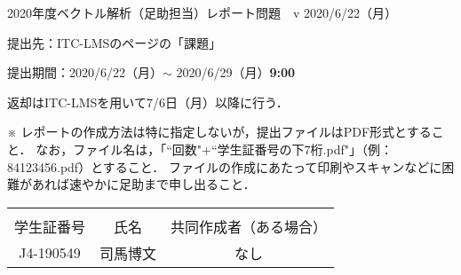 \documentclass[dvipdfmx,uplatex,nosetpagesize]{jsarticle}
\newcommand\GAKUSEISHOBANGO{J4-190549}%
\newcommand\NAMAE{司馬博文}%
\newcommand\KYODOSAKUSEISHA{なし}%
\theoremstyle{definition}
\theoremstyle{StatementsWithStar}
\theoremstyle{StatementsWithStar2}
\theoremstyle{StatementsWithStar3}
\theoremstyle{StatementsWithCCirc}
\theoremstyle{definition}
\begin{document}
\thispagestyle{empty}
\setlength{\parindent}{1zw}
\setlength{\baselineskip}{13pt}
\setcounter{section}{8}
\setcounter{version}{1}
\noindent
2020年度ベクトル解析（足助担当）レポート問題~\thesection~v\theversion%
\hfil2020/6/22（月）\par\noindent
提出先：ITC-LMSのページの「課題」\par\noindent
提出期間：2020/6/22（月）$\sim$ 2020/6/29（月）\textbf{9:00}\par\noindent
返却はITC-LMSを用いて7/6日（月）以降に行う．\par\noindent
※ レポートの作成方法は特に指定しないが，提出ファイルはPDF形式とすること．
なお，ファイル名は，「``回数"+``学生証番号の下7桁.pdf\/"」（例：84123456.pdf）とすること．
ファイルの作成にあたって印刷やスキャンなどに困難があれば速やかに足助まで申し出ること．
\vskip-18pt\noindent
\begin{table}[h]
\begin{tabular}{|c|c|c|} \hline
& & \\[-13pt]
学生証番号& 氏名 & 共同作成者（ある場合）\\[2pt] \hline
\rule{0pt}{16pt}%
\parbox[c]{9.2zw}{\GAKUSEISHOBANGO\hfill} & \parbox[c]{13.0zw}{\NAMAE\hfill} & \parbox[c]{25.6zw}{\KYODOSAKUSEISHA\hfill}\\[6pt] \hline
\end{tabular}
\end{table}
\end{document}
